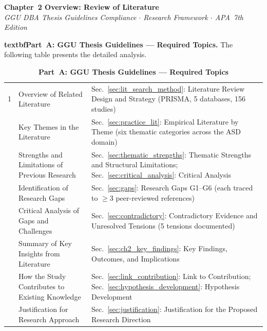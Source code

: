 
\thispagestyle{plain}

\begin{center}
{\large\bfseries\color{ggunavy} Chapter~2 Overview: Review of Literature}\\[0.2cm]
{\small\textit{GGU DBA Thesis Guidelines Compliance $\cdot$ Research Framework $\cdot$ APA~7th Edition}}
\end{center}

\vspace{0.3cm}

\noindent\textbf{textbfPart~A: GGU Thesis Guidelines --- Required Topics.} The following table presents the detailed analysis.

\begin{table}[!htbp]
\caption{Appendix Ch2 Ggu Checklist Table 1}
\tablestripes
\caption*{\textbf{Part~A: GGU Thesis Guidelines --- Required Topics}}
\tablefontsize
\begin{tabularx}{\textwidth}{@{} p{0.4cm} L L @{}}
\toprule
\thead{\#} &  &  \\
 & Overview of Related Literature & Sec.~\ref{sec:lit_search_method}: Literature Review Design and Strategy (PRISMA, 5 databases, 156 studies) \\
 & Key Themes in the Literature & Sec.~\ref{sec:practice_lit}: Empirical Literature by Theme (six thematic categories across the ASD domain) \\
 & Strengths and Limitations of Previous Research & Sec.~\ref{sec:thematic_strengths}: Thematic Strengths and Structural Limitations; Sec.~\ref{sec:critical_analysis}: Critical Analysis \\
 & Identification of Research Gaps & Sec.~\ref{sec:gaps}: Research Gaps G1--G6 (each traced to $\geq$3 peer-reviewed references) \\
 & Critical Analysis of Gaps and Challenges & Sec.~\ref{sec:contradictory}: Contradictory Evidence and Unresolved Tensions (5 tensions documented) \\
 & Summary of Key Insights from Literature & Sec.~\ref{sec:ch2_key_findings}: Key Findings, Outcomes, and Implications \\
 & How the Study Contributes to Existing Knowledge & Sec.~\ref{sec:link_contribution}: Link to Contribution; Sec.~\ref{sec:hypothesis_development}: Hypothesis Development \\
 & Justification for Research Approach & Sec.~\ref{sec:justification}: Justification for the Proposed Research Direction \\
\bottomrule
\end{tabularx}
\end{table}

